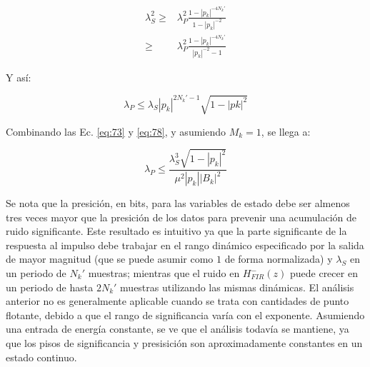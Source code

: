 \documentclass[conference]{IEEEtran}
\begin{document}
\begin{align}
    \lambda_S^2 \geq & \lambda_P^2 \frac{1-|p_k|^{-4N_k'}}{1-|p_k|^{-2}}\\
                \geq & \lambda_P^2 \frac{1-|p_k|^{-4N_k'}}{|p_k|^{-2}-1}
\end{align}

Y así:

\begin{equation}
    \lambda_P \leq \lambda_S |p_k|^{2N_k' - 1} \sqrt{1-|pk|^2}
    \label{eq:78}
\end{equation}

Combinando las Ec. \ref{eq:73} y \ref{eq:78}, y asumiendo \(M_k = 1\), se llega a:

\begin{equation}
    \lambda_P \leq \frac{\lambda_S^3 \sqrt{1-|p_k|^2}}{\mu^2 |p_k| |B_k|^2}
\end{equation}

Se nota que la presición, en bits, para las variables de estado debe ser almenos tres veces mayor que la presición de los datos para prevenir una acumulación de ruido significante. Este resultado es intuitivo ya que la parte significante de la respuesta al impulso debe trabajar en el rango dinámico especificado por la salida de mayor magnitud (que se puede asumir como \(1\) de forma normalizada) y \(\lambda_S\) en un periodo de \(N_k'\) muestras; mientras que el ruido en \(H_{FIR}^{-}(z)\) puede crecer en un periodo de hasta \(2N_k'\) muestras utilizando las mismas dinámicas. El análisis anterior no es generalmente aplicable cuando se trata con cantidades de punto flotante, debido a que el rango de significancia varía con el exponente. Asumiendo una entrada de energía constante, se ve que el análisis todavía se mantiene, ya que los pisos de significancia y presisición son aproximadamente constantes en un estado continuo.
\end{document}
